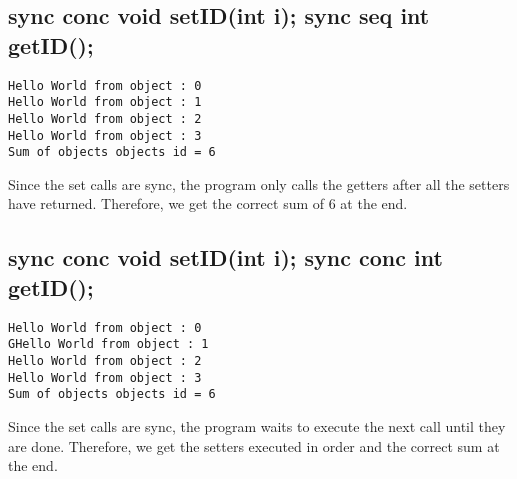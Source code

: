 \documentclass[a4paper]{article}
\begin{document}
\subsection{sync conc void setID(int i); sync seq int getID();}

\begin{lstlisting}
Hello World from object : 0
Hello World from object : 1
Hello World from object : 2
Hello World from object : 3
Sum of objects objects id = 6
\end{lstlisting}

Since the set calls are sync, the program only calls the getters after all the setters have returned. Therefore, we get the correct sum of 6 at the end.

\subsection{sync conc void setID(int i); sync conc int getID();}

\begin{lstlisting}
Hello World from object : 0
GHello World from object : 1
Hello World from object : 2
Hello World from object : 3
Sum of objects objects id = 6
\end{lstlisting}

Since the set calls are sync, the program waits to execute the next call until they are done. Therefore, we get the setters executed in order and the correct sum at the end.
\end{document}
